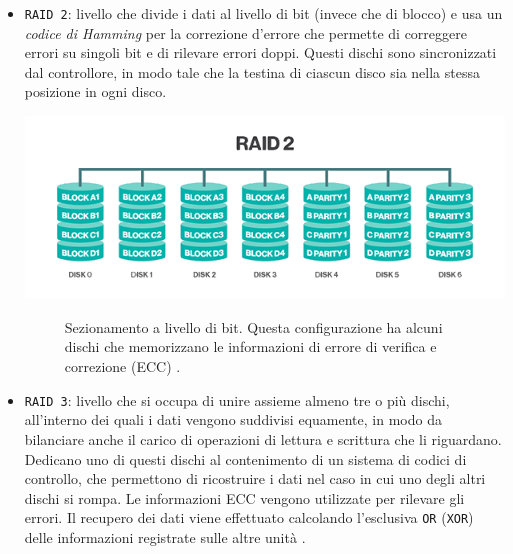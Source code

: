 \begin{itemize}
\item
\verb"RAID 2": livello che divide i dati al livello di bit (invece che di blocco) e usa un \textit{codice di Hamming} per la correzione d'errore che permette di correggere errori su singoli bit e di rilevare errori doppi. Questi dischi sono sincronizzati dal controllore, in modo tale che la testina di ciascun disco sia nella stessa posizione in ogni disco\cite{etichetta10}.\\

\begin{center}
\includegraphics[scale=0.60]{img/raid22.png}
\end{center}
\begin{figure}[htbp]
\caption{Sezionamento a livello di bit. Questa configurazione ha alcuni dischi che memorizzano le informazioni di errore di verifica e correzione (ECC) \cite{etichetta9}.}
\label{fig:raid22}
\end{figure}

\item
\verb"RAID 3": livello che si occupa di unire assieme almeno tre o pi\`{u} dischi, all'interno dei quali i dati vengono suddivisi equamente, in modo da bilanciare anche il carico di operazioni di lettura e scrittura che li riguardano. Dedicano uno di questi dischi al contenimento di un sistema di codici di controllo, che permettono di ricostruire i dati nel caso in cui uno degli altri dischi si rompa. Le informazioni ECC vengono utilizzate per rilevare gli errori. Il recupero dei dati viene effettuato calcolando l'esclusiva \verb"OR" (\verb"XOR") delle informazioni registrate sulle altre unit\`{a} \cite{etichetta9}.\\ 


\end{itemize}
